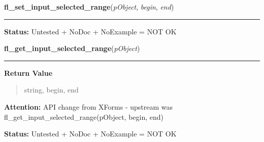     \label{xformslib:library:fl_set_input_selected_range}

    \vspace{0.5ex}

\hspace{.8\funcindent}\begin{boxedminipage}{\funcwidth}

    \raggedright \textbf{fl\_set\_input\_selected\_range}(\textit{pObject}, \textit{begin}, \textit{end})

    \vspace{-1.5ex}

    \rule{\textwidth}{0.5\fboxrule}
\setlength{\parskip}{2ex}
\setlength{\parskip}{1ex}
\textbf{Status:} Untested + NoDoc + NoExample = NOT OK



    \end{boxedminipage}

    \label{xformslib:library:fl_get_input_selected_range}

    \vspace{0.5ex}

\hspace{.8\funcindent}\begin{boxedminipage}{\funcwidth}

    \raggedright \textbf{fl\_get\_input\_selected\_range}(\textit{pObject})

    \vspace{-1.5ex}

    \rule{\textwidth}{0.5\fboxrule}
\setlength{\parskip}{2ex}
\setlength{\parskip}{1ex}
      \textbf{Return Value}
    \vspace{-1ex}

      \begin{quote}
      string, begin, end

      \end{quote}

\textbf{Attention:} API change from XForms - upstream was 
fl\_get\_input\_selected\_range(pObject, begin, end)



\textbf{Status:} Untested + NoDoc + NoExample = NOT OK



    \end{boxedminipage}

